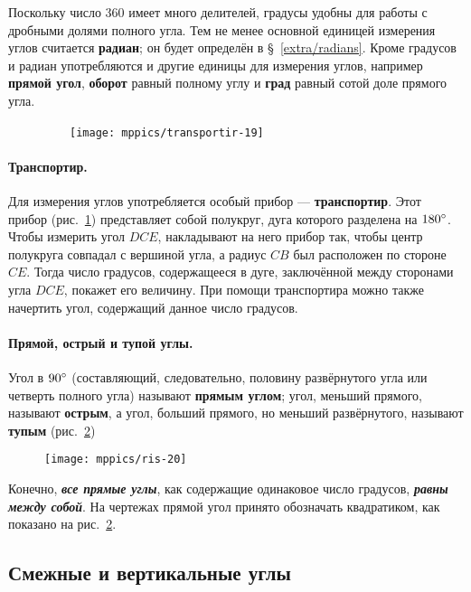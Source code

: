 Поскольку число 360 имеет много делителей,
градусы удобны для работы с дробными долями полного угла.
Тем не менее основной единицей измерения углов считается \textbf{радиан};
он будет определён в §~\ref{extra/radians}. 
Кроме градусов и радиан употребляются и другие единицы для измерения углов, например \textbf{прямой угол}, \textbf{оборот} равный полному углу и
\textbf{град} равный сотой доле прямого угла.

\begin{figure}[!ht]
\centering
\ \ \ \ \texttt{[image: mppics/transportir-19]}
\caption{}\label{1938/ris-19}
\end{figure}

\paragraph{Транспортир.}\label{1938/20}
Для измерения углов употребляется особый прибор — \textbf{транспортир}.
Этот прибор (рис.~\ref{1938/ris-19}) представляет собой полукруг, дуга которого разделена на $180\degree $.
Чтобы измерить угол $DCE$, накладывают на него прибор так, чтобы центр полукруга совпадал с вершиной угла, а радиус $CB$ был расположен по стороне $CE$.
Тогда число градусов, содержащееся в дуге, заключённой между сторонами угла $DCE$, покажет его величину.
При помощи транспортира можно также начертить угол, содержащий данное число градусов.

\paragraph{Прямой, острый и тупой углы.}\label{1938/21}
Угол в $90\degree$ (составляющий, следовательно, половину развёрнутого угла или четверть полного угла) называют \textbf{прямым углом};
угол, меньший прямого, называют \textbf{острым}, а угол, больший прямого, но меньший развёрнутого, называют \textbf{тупым} (рис.~\ref{1938/ris-20})

\begin{figure}[!ht]
\centering
\texttt{[image: mppics/ris-20]}
\caption{}\label{1938/ris-20}
\end{figure}

Конечно, \textbf{\emph{все прямые углы}}, как содержащие одинаковое число градусов, \textbf{\emph{равны между собой}}.
На чертежах прямой угол принято обозначать квадратиком, как показано на рис.~\ref{1938/ris-20}.

\subsection*{Смежные и вертикальные углы}



